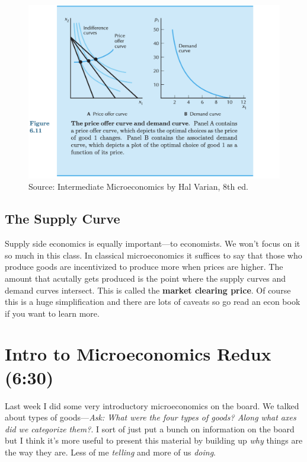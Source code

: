 \documentclass[11pt]{article}
\begin{document}
\begin{figure}[h]
    \centering
    \includegraphics*[width=4.5in]{demandcurve.png}
    \caption{Source: Intermediate Microeconomics by Hal Varian, 8th ed.}
    \label{fig:demand}
\end{figure}

\subsection{The Supply Curve}

Supply side economics is equally important---to economists. We won't focus on it so much in this class. In classical microeconomics it suffices to say that those who produce goods are incentivized to produce more when prices are higher. The amount that acutally gets produced is the point where the supply curves and demand curves intersect. This is called the {\bf market clearing price}. Of course this is a huge simplification and there are lots of caveats so go read an econ book if you want to learn more. 



\section{Intro to Microeconomics Redux (6:30)}

Last week I did some very introductory microeconomics on the board. We talked about types of goods---{\it Ask: What were the four types of goods? Along what axes did we categorize them?}. I sort of just put a bunch on information on the board but I think it's more useful to present this material by building up {\it why} things are the way they are. Less of me {\it telling} and more of us {\it doing}.
\end{document}
